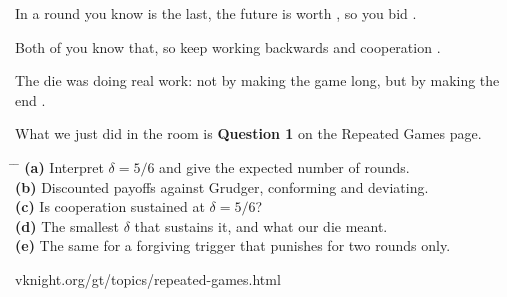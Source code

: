 \vspace{1.4cm}

{\Large In a round you know is the last, the future is worth
, so you bid .}

\vspace{1.6cm}

{\Large Both of you know that, so keep working backwards and cooperation
.}

\vspace{1.6cm}

{\Large The die was doing real work: not by making the game long, but by
making the end .}

\newpage
{}

\vspace{0.5cm}

{\large What we just did in the room is \textbf{Question 1} on the Repeated
Games page.}

\vspace{0.9cm}

\hspace{0.6cm}
\begin{minipage}{0.92\linewidth}
{\large
\begin{tabbing}
\hspace{1.2cm} \= \hspace{17cm} \= \kill
\textbf{(a)} \> Interpret \(\delta = 5/6\) and give the expected number of
  rounds. \> [2]\\[0.55em]
\textbf{(b)} \> Discounted payoffs against Grudger, conforming and
  deviating. \> [6]\\[0.55em]
\textbf{(c)} \> Is cooperation sustained at \(\delta = 5/6\)? \> [4]\\[0.55em]
\textbf{(d)} \> The smallest \(\delta\) that sustains it, and what our die
  meant. \> [5]\\[0.55em]
\textbf{(e)} \> The same for a forgiving trigger that punishes for two rounds
  only. \> [7]
\end{tabbing}}
\end{minipage}

\vspace{1.2cm}

\begin{center}
{\large\color{inkgrey} vknight.org/gt/topics/repeated-games.html}
\end{center}

